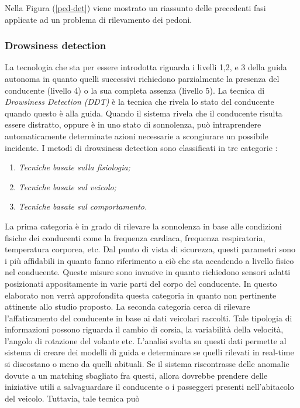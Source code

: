 Nella Figura (\ref{ped-det}) viene mostrato un riassunto delle precedenti fasi 
applicate ad un problema di rilevamento dei pedoni.

\subsubsection{Drowsiness detection}
La tecnologia che sta per essere introdotta riguarda i livelli 1,2, e 3 della guida 
autonoma in quanto quelli successivi richiedono parzialmente la presenza 
del conducente (livello 4) o la sua completa assenza (livello 5). La tecnica 
di \emph{Drowsiness Detection (DDT)} è la tecnica che rivela lo stato del conducente 
quando questo è alla guida. Quando il sistema rivela che il conducente risulta 
essere distratto, oppure è in uno stato di sonnolenza, può intraprendere 
automaticamente determinate azioni necessarie a scongiurare un possibile 
incidente. I metodi di drowsiness detection sono classificati in 
tre categorie \cite{drowsiness-detection}:
\begin{enumerate}
    \item \emph{Tecniche basate sulla fisiologia;}
    \item \emph{Tecniche basate sul veicolo;}
    \item \emph{Tecniche basate sul comportamento.}
\end{enumerate}
La prima categoria è in grado di rilevare la sonnolenza in base alle condizioni 
fisiche dei conducenti come la frequenza cardiaca, frequenza respiratoria, 
temperatura corporea, etc. Dal punto di vista di sicurezza, questi parametri 
sono i più affidabili in quanto fanno riferimento a ciò che sta accadendo a livello 
fisico nel conducente. Queste misure sono invasive in quanto richiedono 
sensori adatti posizionati appositamente in varie parti del corpo del conducente. 
In questo elaborato non verrà approfondita questa categoria in quanto 
non pertinente attinente allo studio proposto. La seconda categoria cerca di 
rilevare l'affaticamento del conducente in base ai dati veicolari raccolti. Tale 
tipologia di informazioni possono riguarda il cambio di corsia, la variabilità 
della velocità, l'angolo di rotazione del volante etc. L'analisi svolta su questi 
dati permette al sistema di creare dei modelli di guida e determinare se quelli 
rilevati in real-time si discostano o meno da quelli abituali. Se il sistema 
riscontrasse delle anomalie dovute a un matching sbagliato fra questi, allora 
dovrebbe prendere delle iniziative utili a salvaguardare il conducente o i 
passeggeri presenti nell'abitacolo del veicolo. Tuttavia, tale tecnica può 
